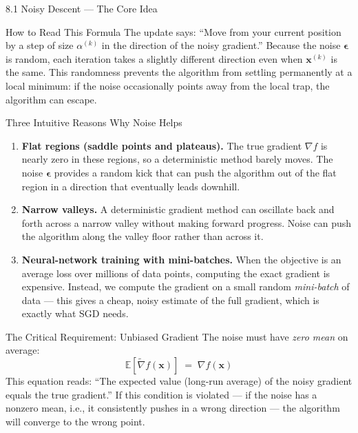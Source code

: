 \documentclass[aspectratio=169,10pt]{beamer}
\begin{document}
\begin{frame}[allowframebreaks]{8.1 Noisy Descent --- The Core Idea}
\begin{alertblock}{How to Read This Formula}
The update says: ``Move from your current position by a step of size $\alpha^{(k)}$ in the direction of the noisy gradient.'' Because the noise $\boldsymbol{\epsilon}$ is random, each iteration takes a slightly different direction even when $\mathbf{x}^{(k)}$ is the same. This randomness prevents the algorithm from settling permanently at a local minimum: if the noise occasionally points away from the local trap, the algorithm can escape.
\end{alertblock}

\framebreak

\begin{block}{Three Intuitive Reasons Why Noise Helps}
\begin{enumerate}
  \item \textbf{Flat regions (saddle points and plateaus).} The true gradient $\nabla f$ is nearly zero in these regions, so a deterministic method barely moves. The noise $\boldsymbol{\epsilon}$ provides a random kick that can push the algorithm out of the flat region in a direction that eventually leads downhill.

  \item \textbf{Narrow valleys.} A deterministic gradient method can oscillate back and forth across a narrow valley without making forward progress. Noise can push the algorithm along the valley floor rather than across it.

  \item \textbf{Neural-network training with mini-batches.} When the objective is an average loss over millions of data points, computing the exact gradient is expensive. Instead, we compute the gradient on a small random \emph{mini-batch} of data --- this gives a cheap, noisy estimate of the full gradient, which is exactly what SGD needs.
\end{enumerate}
\end{block}

\begin{block}{The Critical Requirement: Unbiased Gradient}
The noise must have \emph{zero mean} on average:
\[
  \mathbb{E}\!\left[\tilde{\nabla} f(\mathbf{x})\right] \;=\; \nabla f(\mathbf{x})
\]
This equation reads: ``The expected value (long-run average) of the noisy gradient equals the true gradient.'' If this condition is violated --- if the noise has a nonzero mean, i.e., it consistently pushes in a wrong direction --- the algorithm will converge to the wrong point.
\end{block}


\end{frame}
\end{document}
